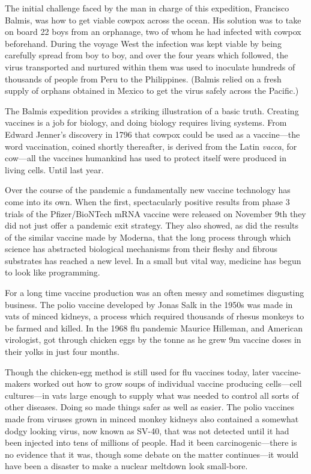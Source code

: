 \documentclass{article}
\begin{document}
The initial challenge faced by the man in charge of this expedition, Francisco Balmis, was how to get viable cowpox across the ocean. His solution was to take on board 22 boys from an orphanage, two of whom he had infected with cowpox beforehand. During the voyage West the infection was kept viable by being carefully spread from boy to boy, and over the four years which followed, the virus transported and nurtured within them was used to inoculate hundreds of thousands of people from Peru to the Philippines. (Balmis relied on a fresh supply of orphans obtained in Mexico to get the virus safely across the Pacific.) 

The Balmis expedition provides a striking illustration of a basic truth. Creating vaccines is a job for biology, and doing biology requires living systems. From Edward Jenner's discovery in 1796 that cowpox could be used as a vaccine---the word vaccination, coined shortly thereafter, is derived from the Latin \emph{vacca}, for cow---all the vaccines humankind has used to protect itself were produced in living cells. Until last year. 

Over the course of the pandemic a fundamentally new vaccine technology has come into its own. When the first, spectacularly positive results from phase 3 trials of the Pfizer/BioNTech mRNA vaccine were released on November 9th they did not just offer a pandemic exit strategy. They also showed, as did the results of the similar vaccine made by Moderna, that the long process through which science has abstracted biological mechanisms from their fleshy and fibrous substrates has reached a new level. In a small but vital way, medicine has begun to look like programming. 

For a long time vaccine production was an often messy and sometimes disgusting business. The polio vaccine developed by Jonas Salk in the 1950s was made in vats of minced kidneys, a process which required thousands of rhesus monkeys to be farmed and killed. In the 1968 flu pandemic Maurice Hilleman, and American virologist, got through chicken eggs by the tonne as he grew 9m vaccine doses in their yolks in just four months. 

Though the chicken-egg method is still used for flu vaccines today, later vaccine-makers worked out how to grow soups of individual vaccine producing cells---cell cultures---in vats large enough to supply what was needed to control all sorts of other diseases. Doing so made things safer as well as easier. The polio vaccines made from viruses grown in minced monkey kidneys also contained a somewhat dodgy looking virus, now known as SV-40, that was not detected until it had been injected into tens of millions of people. Had it been carcinogenic---there is no evidence that it was, though some debate on the matter continues---it would have been a disaster to make a nuclear meltdown look small-bore. 
\end{document}
